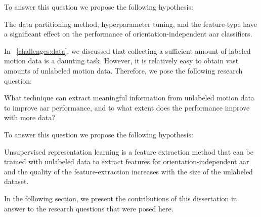 To answer this question we propose the following hypothesis:

\begin{hypothesis}
\label{hyp:aar_analysis}
    The data partitioning method, hyperparameter tuning, and the feature-type have a significant effect on the performance of orientation-independent \gls{aar} classifiers.
\end{hypothesis}

In \sectionname~\ref{challenges:data}, we discussed that collecting a sufficient amount of labeled motion data is a daunting task. However, it is relatively easy to obtain vast amounts of unlabeled motion data.
Therefore, we pose the following research question:

\begin{ResearchQuestion}
\label{rq:deep_unsupervised}
    What technique can extract meaningful information from unlabeled motion data to improve \gls{aar} performance, and to what extent does the performance improve with more data?
\end{ResearchQuestion}

To answer this question we propose the following hypothesis:

\begin{hypothesis}
\label{hyp:deep_unsupervised}
    Unsupervised representation learning is a feature extraction method that can be trained with unlabeled data to extract features for orientation-independent \gls{aar} and the quality of the feature-extraction increases with the size of the unlabeled dataset.
\end{hypothesis}


In the following section, we present the contributions of this dissertation in answer to the research questions that were posed here.









